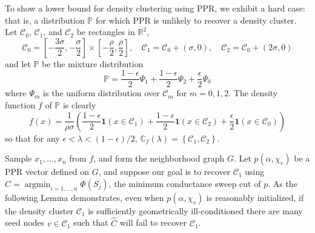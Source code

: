 \documentclass{article}
\newcommand{\Reals}{\mathbb{R}}
\newcommand{\set}[1]{\left\{#1\right\}}
\DeclareMathOperator*{\argmin}{argmin}
\newcommand{\Pbb}{\mathbb{P}}
\newcommand{\1}{\mathbf{1}}
\theoremstyle{alden}
\theoremstyle{aldenthm}
\theoremstyle{remark}
\begin{document}
To show a lower bound for density clustering using PPR, we exhibit a hard case: that is, a distribution $\Pbb$ for which PPR is unlikely to recover a density cluster. Let $\mathcal{C}_0$, $\mathcal{C}_1$, and $\mathcal{C}_2$ be rectangles in $\Reals^2$, 
\begin{equation*}
\mathcal{C}_0 = \left[-\frac{3\sigma}{2}, -\frac{\sigma}{2}\right] \times \left[-\frac{\rho}{2}, \frac{\rho}{2}\right], \quad \mathcal{C}_1 = \mathcal{C}_0 + (\sigma,0), \quad \mathcal{C}_2 = \mathcal{C}_0 + (2\sigma,0)
\end{equation*}
and let $\mathbb{P}$ be the mixture distribution
\begin{equation*}
\mathbb{P} = \frac{1 - \epsilon}{2} \Psi_1 + \frac{1 - \epsilon}{2} \Psi_2 + \frac{\epsilon}{2} \Psi_0
\end{equation*}
where $\Psi_m$ is the uniform distribution over $\mathcal{C}_m$ for $m = 0,1,2$. 
The density function $f$ of $\Pbb$ is clearly
\begin{equation*}
f(x) = \frac{1}{\rho\sigma}\left(\frac{1 - \epsilon}{2}\1(x \in \mathcal{C}_1) + \frac{1 - \epsilon}{2}\1(x \in \mathcal{C}_2) + \frac{\epsilon}{2}\1(x \in \mathcal{C}_0)  \right)
\end{equation*}
so that for any $\epsilon < \lambda < (1 - \epsilon)/2$, $\mathbb{C}_{f}(\lambda) = \set{\mathcal{C}_1, \mathcal{C}_2}$. 

Sample $x_1,\ldots,x_n$ from $f$, and form the neighborhood graph $G$. Let $p(\alpha,\chi_v)$ be a PPR vector defined on $G$, and suppose our goal is to recover $\mathcal{C}_1$ using $\widehat{C} = \argmin_{i = 1,\ldots,n} \Phi(S_j)$, the minimum conductance sweep cut of $p$. As the following Lemma demonstrates, even when $p(\alpha,\chi_v)$ is reasonably initialized, if the density cluster $\mathcal{C}_1$ is sufficiently geometrically ill-conditioned there are many seed nodes $v \in \mathcal{C}_1$ such that $\widehat{C}$ will fail to recover $\mathcal{C}_1$.
\end{document}
